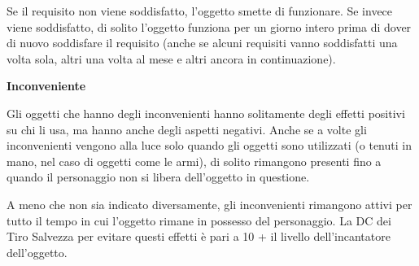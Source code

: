 \documentclass[a4paper,11pt,twoside,openany]{book}
\begin{document}
Se il requisito non viene soddisfatto, l'oggetto smette di funzionare. Se invece viene soddisfatto, di solito l'oggetto funziona per un giorno intero prima di dover di nuovo soddisfare il requisito (anche se alcuni requisiti vanno soddisfatti una volta sola, altri
una volta al mese e altri ancora in continuazione).

\textbf{Inconveniente}

Gli oggetti che hanno degli inconvenienti hanno solitamente degli effetti positivi su chi li usa, ma hanno anche degli aspetti negativi. Anche se a volte gli inconvenienti vengono alla luce solo quando gli oggetti sono utilizzati (o tenuti in mano, nel caso di oggetti come le armi), di solito rimangono presenti fino a quando il personaggio non si libera dell'oggetto in questione.

A meno che non sia indicato diversamente, gli inconvenienti rimangono attivi per tutto il tempo in cui l'oggetto rimane in possesso del personaggio. La DC dei Tiro Salvezza per evitare questi effetti è pari a 10 + il livello dell'incantatore dell'oggetto.

\bigskip
\end{document}
